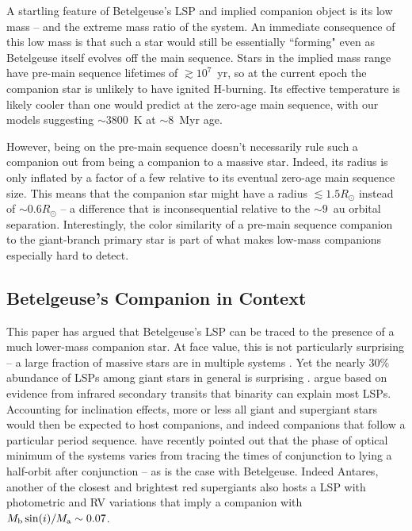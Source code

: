 \documentclass[twocolumn]{aastex631}
\begin{document}
A startling feature of Betelgeuse's LSP and implied companion object is its low mass -- and the extreme mass ratio of the system. An immediate consequence of this low mass is that such a star would still be essentially ``forming" even as Betelgeuse itself evolves off the main sequence. Stars in the implied mass range have pre-main sequence lifetimes of $\gtrsim 10^7$~yr, so at the current epoch the companion star is unlikely to have ignited H-burning. Its effective temperature is likely cooler than one would predict at the zero-age main sequence, with our models suggesting $\sim 3800$~K at $\sim 8$~Myr age. 

However, being on the pre-main sequence doesn't necessarily rule such a companion out from being a companion to a massive star. Indeed, its radius is only inflated by a factor of a few relative to its eventual zero-age main sequence size. This means that the companion star might have a radius $\lesssim1.5R_\odot$ instead of $\sim 0.6R_\odot$ -- a difference that is inconsequential relative to the $\sim 9$~au orbital separation. Interestingly, the color similarity of a pre-main sequence companion to the giant-branch primary star is part of what makes low-mass companions especially hard to detect. 


\subsection{Betelgeuse's Companion in Context}

This paper has argued that Betelgeuse's LSP can be traced to the presence of a much lower-mass companion star. At face value, this is not particularly surprising -- a large fraction of massive stars are in multiple systems \citep{2023ASPC..534..275O}. Yet the nearly 30\% abundance of LSPs among giant stars in general is surprising \citep{2004ApJ...604..800W}. \citet{2021ApJ...911L..22S} argue based on evidence from infrared secondary transits that binarity can explain most LSPs. Accounting for inclination effects, more or less all giant and supergiant stars would then be expected to host companions, and indeed companions that follow a particular period sequence. \citet{2024arXiv240809089G} have recently pointed out that the phase of optical minimum of the systems varies from tracing the times of conjunction to lying a half-orbit after conjunction -- as is the case with Betelgeuse. Indeed Antares, another of the closest and brightest red supergiants also hosts a LSP with photometric and RV variations \cite{2013AJ....145...38P} that imply a companion with $M_{\rm b} \sin(i) / M_{\rm a} \sim 0.07$. 
\end{document}
